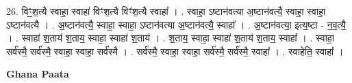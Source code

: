 \documentclass[17pt]{extarticle}
\begin{document}
26. विꣳ॒॒श॒त्यै स्वाहा॒ स्वाहा॑ विꣳश॒त्यै विꣳ॑श॒त्यै स्वाहा᳚ । . स्वाहा॒ ऽष्टान॑वत्या अ॒ष्टान॑वत्यै॒ स्वाहा॒ स्वाहा॒ ऽष्टान॑वत्यै । . अ॒ष्टान॑वत्यै॒ स्वाहा॒ स्वाहा॒ ऽष्टान॑वत्या अ॒ष्टान॑वत्यै॒ स्वाहा᳚ । . अ॒ष्टान॑वत्या॒ इत्य॒ष्टा - न॒व॒त्यै॒ । . स्वाहा॑ श॒ताय॑ श॒ताय॒ स्वाहा॒ स्वाहा॑ श॒ताय॑ । . श॒ताय॒ स्वाहा॒ स्वाहा॑ श॒ताय॑ श॒ताय॒ स्वाहा᳚ । . स्वाहा॒ सर्व॑स्मै॒ सर्व॑स्मै॒ स्वाहा॒ स्वाहा॒ सर्व॑स्मै । . सर्व॑स्मै॒ स्वाहा॒ स्वाहा॒ सर्व॑स्मै॒ सर्व॑स्मै॒ स्वाहा᳚ । . स्वाहेति॒ स्वाहा᳚ । \newline

\textbf{Ghana Paata } \newline
\end{document}
